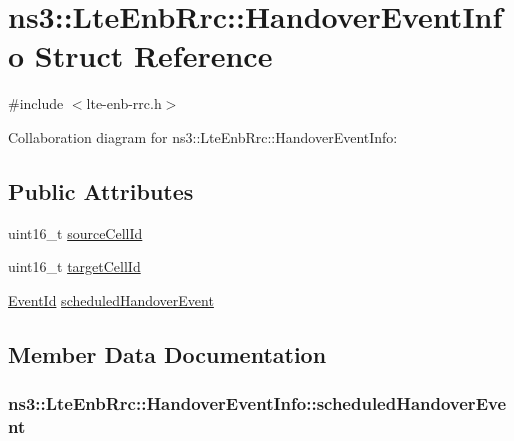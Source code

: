 \hypertarget{structns3_1_1LteEnbRrc_1_1HandoverEventInfo}{}\section{ns3\+:\+:Lte\+Enb\+Rrc\+:\+:Handover\+Event\+Info Struct Reference}
\label{structns3_1_1LteEnbRrc_1_1HandoverEventInfo}


{\ttfamily \#include $<$lte-\/enb-\/rrc.\+h$>$}



Collaboration diagram for ns3\+:\+:Lte\+Enb\+Rrc\+:\+:Handover\+Event\+Info\+:
\subsection*{Public Attributes}
\begin{DoxyCompactItemize}
\item 
uint16\+\_\+t \hyperlink{structns3_1_1LteEnbRrc_1_1HandoverEventInfo_aa80dfd7a49d448f8aaed3e568c8eb1d5}{source\+Cell\+Id}
\item 
uint16\+\_\+t \hyperlink{structns3_1_1LteEnbRrc_1_1HandoverEventInfo_a5782b9cc9dd2f0b1b0037442b1c8ccfe}{target\+Cell\+Id}
\item 
\hyperlink{classns3_1_1EventId}{Event\+Id} \hyperlink{structns3_1_1LteEnbRrc_1_1HandoverEventInfo_a5902dac57c338dc774d1893da9cab362}{scheduled\+Handover\+Event}
\end{DoxyCompactItemize}


\subsection{Member Data Documentation}
\subsubsection[{\texorpdfstring{scheduled\+Handover\+Event}{scheduledHandoverEvent}}]{ ns3\+::\+Lte\+Enb\+Rrc\+::\+Handover\+Event\+Info\+::scheduled\+Handover\+Event}\hypertarget{structns3_1_1LteEnbRrc_1_1HandoverEventInfo_a5902dac57c338dc774d1893da9cab362}{}\label{structns3_1_1LteEnbRrc_1_1HandoverEventInfo_a5902dac57c338dc774d1893da9cab362}
